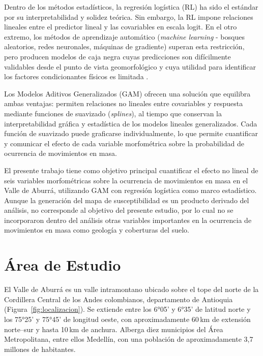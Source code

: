\documentclass[12pt,a4paper]{article}
\begin{document}
Dentro de los métodos estadísticos, la regresión logística
(RL) ha sido el estándar por su interpretabilidad y solidez teórica.
Sin embargo, la RL impone relaciones lineales entre el predictor lineal
y las covariables en escala logit. En el otro extremo, los métodos de aprendizaje automático (\textit{machine learning} - bosques aleatorios, redes neuronales,
máquinas de gradiente) superan esta restricción, pero producen modelos
de caja negra cuyas predicciones son difícilmente validables desde el
punto de vista geomorfológico y cuya utilidad para identificar los
factores condicionantes físicos es limitada
\citep{merghadi2020machine}.

Los Modelos Aditivos Generalizados (GAM)
\citep{hastie1990generalized, wood2017generalized} ofrecen una solución
que equilibra ambas ventajas: permiten relaciones no lineales entre
covariables y respuesta mediante funciones de suavizado
(\textit{splines}), al tiempo que conservan la interpretabilidad
gráfica y estadística de los modelos lineales generalizados. Cada
función de suavizado puede graficarse individualmente, lo que permite
cuantificar y comunicar el efecto de cada variable morfométrica sobre
la probabilidad de ocurrencia de movimientos en masa.

El presente trabajo tiene como objetivo principal cuantificar
el efecto no lineal de seis variables morfométricas sobre la ocurrencia
de movimientos en masa en el Valle de Aburrá, utilizando GAM con
regresión logística como marco estadístico. Aunque la generación del mapa de
susceptibilidad es un producto derivado del análisis, no corresponde al objetivo del presente estudio, por lo cual no se incorporaron dentro del análisis otras variables importantes en la ocurrencia de movimientos en masa como geología y coberturas del suelo.

\section{Área de Estudio}

El Valle de Aburrá es un valle intramontano ubicado sobre el tope del norte de la Cordillera Central de los Andes colombianos,
departamento de Antioquia (Figura~\ref{fig:localizacion}). Se
extiende entre los 6°05' y 6°35' de latitud norte y los 75°25' y
75°45' de longitud oeste, con aproximadamente 60\,km de extensión
norte--sur y hasta 10\,km de anchura. Alberga diez municipios del Área
Metropolitana, entre ellos Medellín, con una población de aproximadamente
3{,}7 millones de habitantes.
\end{document}
